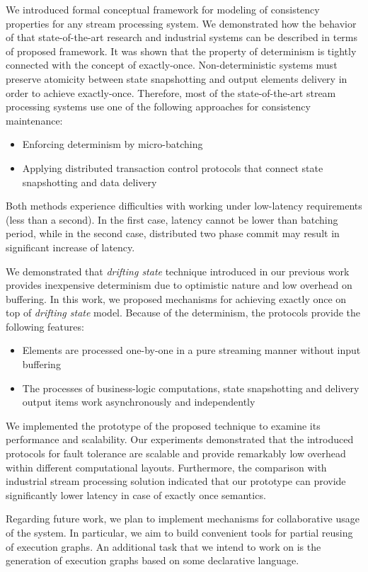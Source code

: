 
\label {fs-conclusion-seciton}

We introduced formal conceptual framework for modeling of consistency properties for any stream processing system. We demonstrated how the behavior of that state-of-the-art research and industrial systems can be described in terms of proposed framework. It was shown that the property of determinism is tightly connected with the concept of exactly-once. Non-deterministic systems must preserve atomicity between state snapshotting and output elements delivery in order to achieve exactly-once. Therefore, most of the state-of-the-art stream processing systems use one of the following approaches for consistency maintenance: 
\begin{itemize}
    \item Enforcing determinism by micro-batching
    \item Applying distributed transaction control protocols that connect state snapshotting and data delivery
\end{itemize}

Both methods experience difficulties with working under low-latency requirements (less than a second). In the first case, latency cannot be lower than batching period, while in the second case, distributed two phase commit may result in significant increase of latency.

We demonstrated that {\em drifting state} technique introduced in our previous work~\cite{we2018adbis} provides inexpensive determinism due to optimistic nature and low overhead on buffering. In this work, we proposed mechanisms for achieving exactly once on top of {\em drifting state} model. Because of the determinism, the protocols provide the following features:

\begin{itemize}
    \item Elements are processed one-by-one in a pure streaming manner without input buffering
    \item The processes of business-logic computations, state snapshotting and delivery output items work asynchronously and independently
\end{itemize}

We implemented the prototype of the proposed technique to examine its performance and scalability. Our experiments demonstrated that the introduced protocols for fault tolerance are scalable and provide remarkably low overhead within different computational layouts. Furthermore, the comparison with industrial stream processing solution indicated that our prototype can provide significantly lower latency in case of exactly once semantics.

Regarding future work, we plan to implement mechanisms for collaborative usage of the system. In particular, we aim to build convenient tools for partial reusing of execution graphs. An additional task that we intend to work on is the generation of execution graphs based on some declarative language.
